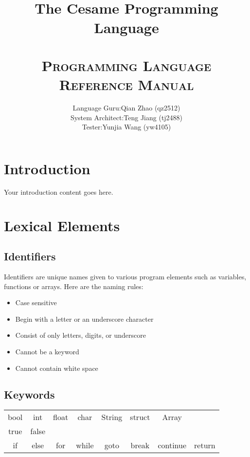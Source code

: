 \documentclass[11pt,A4]{article}
\title{
    \normalfont \LARGE
    \horrule{1pt} \\[0.4cm] 
    \huge The Cesame Programming Language \\
    \horrule{1pt} \\[0.6cm] 
    \textsc{Programming Language Reference Manual} \\ [25pt]
}
\author{
   \begin{tabular}{ll}
       Language Guru: & Qian Zhao (qz2512) \\[5pt]
       System Architect: & Teng Jiang (tj2488) \\[5pt]
       Tester: & Yunjia Wang (yw4105)
   \end{tabular}
}
\date{}
\begin{document}
    \maketitle
    \thispagestyle{plain}
    \newpage
    
    \tableofcontents
    
    \newpage
    \section{Introduction}
    Your introduction content goes here.

    \newpage
    \section{Lexical Elements}
    
        \subsection{Identifiers}
        Identifiers are unique names given to various program elements such as variables, functions or arrays. Here are the naming rules:
        \begin{itemize}
            \item Case sensitive
            \item Begin with a letter or an underscore character
            \item Consist of only letters, digits, or underscore
            \item Cannot be a keyword
            \item Cannot contain white space
        \end{itemize}
        
        \subsection{Keywords}
        \begin{center}
            \begin{tabular}{ c c c c c c c c}
            bool & int & float & char & String & struct & Array \\
            true & false \\ 
            if & else & for & while & goto & break & continue & return \\  
            \end{tabular}
        \end{center}
        
\end{document}
